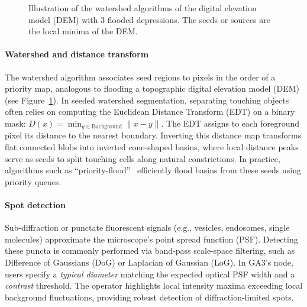 \begin{figure}[ht]\centering
  \caption{Illustration of the watershed algorithms of the digital elevation model (DEM) with 3 flooded depressions. The seeds or sources are the local minima of the DEM.}
  \label{fig:watershed}
\end{figure}



\paragraph{Watershed and distance transform} The watershed algorithm associates seed regions to pixels in the order of a priority map, analogous to flooding a topographic digital elevation model (DEM) (see Figure~\ref{fig:watershed}). In seeded watershed segmentation, separating touching objects often relies on computing the Euclidean Distance Transform (EDT) on a binary mask: $D(x) = \min_{y \in \text{Background}} \|x - y\|$. The EDT assigns to each foreground pixel its distance to the nearest boundary. Inverting this distance map transforms flat connected blobs into inverted cone-shaped basins, where local distance peaks serve as seeds to split touching cells along natural constrictions. In practice, algorithms such as ``priority-flood''~\cite{barnes2014} efficiently flood basins from these seeds using priority queues.

\paragraph{Spot detection} Sub-diffraction or punctate fluorescent signals (e.g., vesicles, endosomes, single molecules) approximate the microscope's point spread function (PSF). Detecting these puncta is commonly performed via band-pass scale-space filtering, such as Difference of Gaussians (DoG) or Laplacian of Gaussian (LoG). In GA3's  node, users specify a \textit{typical diameter} matching the expected optical PSF width and a \textit{contrast} threshold. The operator highlights local intensity maxima exceeding local background fluctuations, providing robust detection of diffraction-limited spots.

